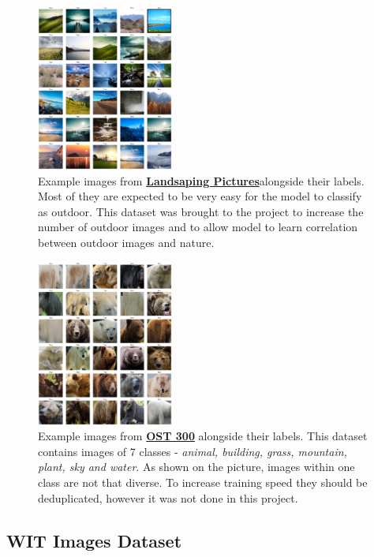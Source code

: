 \documentclass[a4paper]{article}
\begin{document}
\begin{figure}[H]
    \centering
    \includegraphics[width=0.4\textwidth]{images/landscaping-pictures.png}
    \caption{Example images from \href{https://www.kaggle.com/datasets/arnaud58/landscape-pictures}{\textbf{Landsaping Pictures}}alongside their labels. Most of they are expected to be very easy for the model to classify as outdoor. This dataset was brought to the project to increase the number of outdoor images and to allow model to learn correlation between outdoor images and nature.}
\end{figure}

\begin{figure}[H]
    \centering
    \includegraphics[width=0.4\textwidth]{images/ost-300.png}
    \caption{Example images from \href{https://paperswithcode.com/dataset/ost300}{\textbf{OST 300}} alongside their labels. This dataset contains images of 7 classes - \textit{animal, building, grass, mountain, plant, sky and water}. As shown on the picture, images within one class are not that diverse. To increase training speed they should be deduplicated, however it was not done in this project.}
\end{figure}

\subsection{WIT Images Dataset}
\end{document}
